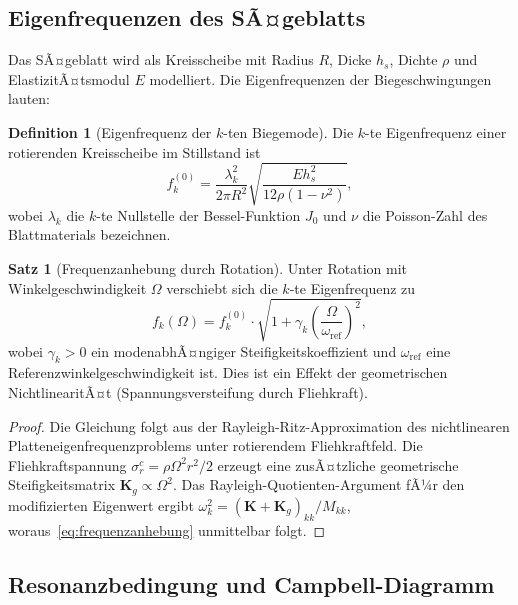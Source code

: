 ﻿\documentclass[a4paper,12pt]{article}
\theoremstyle{definition}
\newtheorem{definition}{Definition}
\newtheorem{satz}{Satz}
\begin{document}
\subsection{Eigenfrequenzen des SÃ¤geblatts}

Das SÃ¤geblatt wird als Kreisscheibe mit Radius $R$, Dicke $h_s$, Dichte $\rho$ und
ElastizitÃ¤tsmodul $E$ modelliert. Die Eigenfrequenzen der Biegeschwingungen lauten:

\begin{definition}[Eigenfrequenz der $k$-ten Biegemode]
Die $k$-te Eigenfrequenz einer rotierenden Kreisscheibe im Stillstand ist
\begin{equation}
\label{eq:eigenfreq}
f_k^{(0)} = \frac{\lambda_k^2}{2\pi R^2}\sqrt{\frac{Eh_s^2}{12\rho(1-\nu^2)}},
\end{equation}
wobei $\lambda_k$ die $k$-te Nullstelle der Bessel-Funktion $J_0$ und $\nu$ die
Poisson-Zahl des Blattmaterials bezeichnen.
\end{definition}

\begin{satz}[Frequenzanhebung durch Rotation]
\label{satz:frequenzanhebung}
Unter Rotation mit Winkelgeschwindigkeit $\Omega$ verschiebt sich die $k$-te Eigenfrequenz zu
\begin{equation}
\label{eq:frequenzanhebung}
f_k(\Omega) = f_k^{(0)} \cdot \sqrt{1 + \gamma_k \left(\frac{\Omega}{\omega_{\mathrm{ref}}}\right)^2},
\end{equation}
wobei $\gamma_k > 0$ ein modenabhÃ¤ngiger Steifigkeitskoeffizient und $\omega_{\mathrm{ref}}$ eine
Referenzwinkelgeschwindigkeit ist. Dies ist ein Effekt der geometrischen NichtlinearitÃ¤t
(Spannungsversteifung durch Fliehkraft).
\end{satz}

\begin{proof}
Die Gleichung folgt aus der Rayleigh-Ritz-Approximation des nichtlinearen Platteneigenfrequenzproblems
unter rotierendem Fliehkraftfeld. Die Fliehkraftspannung $\sigma_r^c = \rho\Omega^2 r^2/2$ erzeugt
eine zusÃ¤tzliche geometrische Steifigkeitsmatrix $\mathbf{K}_g \propto \Omega^2$. Das Rayleigh-Quotienten-Argument
fÃ¼r den modifizierten Eigenwert ergibt $\omega_k^2 = (\mathbf{K} + \mathbf{K}_g)_{kk}/M_{kk}$,
woraus~\eqref{eq:frequenzanhebung} unmittelbar folgt.
\end{proof}

\subsection{Resonanzbedingung und Campbell-Diagramm}
\end{document}
